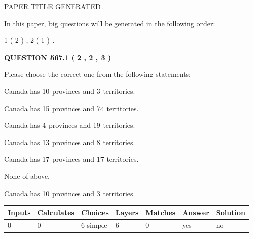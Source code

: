 \documentclass[12pt]{article}
\begin{document}
   
\vspace{0.2in}
   
   
   
   
   
   
   
   
 \vspace{0.2in}
 
 
 
 
   
   
 PAPER TITLE GENERATED.
   
   
   
\vspace{0.2in}
   
In this paper, big questions will be generated in the following order: 
   
   
   1 ( 2 )
 ,
   2 ( 1 )
 .
  
\vspace{0.2in}
  
{\textbf{\Large{QUESTION
567.1 
 ( 2 , 2 , 3 )
}}}
  
  
Please choose the correct one from the following statements:
 
 
Canada has 10  provinces and 3 territories.
 
 
Canada has  15 provinces and  74 territories.
 
 
Canada has   4 provinces and  19 territories.
 
 
Canada has  13 provinces and  8 territories.
 
 
Canada has  17 provinces and  17 territories.
 
 
 None of above.
 
 
\noindent{}
 
 
Canada has 10  provinces and 3 territories.
 
 
\noindent{}
 
 
   
   
   
   
\noindent\begin{tabular}{|l|l|l|l|l|l|l|}
 \hline
Inputs & Calculates & Choices & Layers & Matches & Answer & Solution \\ \hline
 0  & 
 0  & 
 6
  simple  
  & 
 6  & 
 0  & 
  yes & 
  no 
  \\ \hline
 \end{tabular}
   
\end{document}
